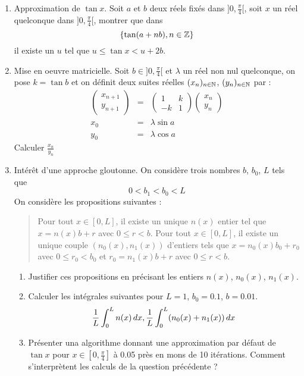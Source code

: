 \begin{enumerate}
\item Approximation de $\tan x$.\newline
Soit $a$ et $b$ deux réels fixés dans $]0,\frac{\pi}{4}[$, soit $x$ un réel quelconque dans $]0,\frac{\pi}{4}[$, montrer que dans
\[\{\tan(a+nb),n\in \mathbb{Z}\}\]
il existe un $u$ tel que $u\leq \tan x < u+2b$.
\item Mise en oeuvre matricielle.\newline
Soit $b\in ]0,\frac{\pi}{4}[$ et $\lambda$ un réel non nul quelconque, on pose $k=\tan b$ et on définit deux suites réelles $(x_n)_{n\in\mathbb{N}}$, $(y_n)_{n\in\mathbb{N}}$ par :
\begin{eqnarray*}
  \begin{pmatrix}
       x_{n+1}\\y_{n+1}
    \end{pmatrix} &=&
    \begin{pmatrix}
       1 & k \\ -k & 1
    \end{pmatrix}
    \begin{pmatrix}
       x_{n}\\y_{n}
    \end{pmatrix}  \\
  x_0 &=& \lambda \sin a \\
  y_0 &=& \lambda \cos a
\end{eqnarray*}
Calculer $\frac{x_n}{y_n}$
\item Intérêt d'une approche gloutonne.\newline
On considère trois nombres $b$, $b_0$, $L$ tels que
\[0<b_1<b_0<L\]
On considère les propositions suivantes :
\begin{quotation}
Pour tout $x\in [0,L]$, il existe un unique $n(x)$ entier tel que $x=n(x)b+r$ avec $0\leq r<b$. \newline
Pour tout $x\in [0,L]$, il existe un unique couple $(n_0(x),n_1(x))$ d'entiers tels que $x=n_0(x)b_0+r_0$ avec $0\leq r_0 < b_0$ et $r_0=n_1(x)b+r$ avec $0\leq r < b$.
\end{quotation}
\begin{enumerate}
\item Justifier ces propositions en précisant les entiers $n(x)$, $n_0(x)$, $n_1(x)$.
\item Calculer les intégrales suivantes pour $L=1$, $b_0=0.1$, $b=0.01$.
\[ \frac{1}{L}\int_0^L n(x)\,dx ,\medskip \frac{1}{L}\int_0^L (n_0(x)+n_1(x))\,dx
\]
\item Présenter una algorithme donnant une approximation par défaut de $\tan x$ pour $x \in [0,\frac{\pi}{4}]$ à 0.05 près en mons de 10 itérations.\newline
Comment s'interprètent les calculs de la question précédente ?
\end{enumerate}
\end{enumerate}
